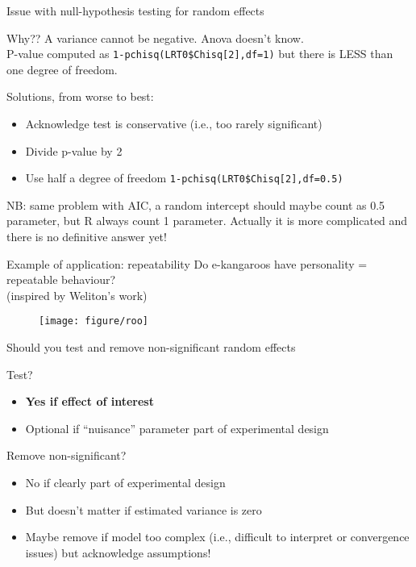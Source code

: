 \documentclass{beamer}
\begin{document}
\begin{frame}{Issue with null-hypothesis testing for random effects}
\begin{alertblock}{Why??}
    A variance cannot be negative. Anova doesn't know.\\
    P-value computed as \texttt{1-pchisq(LRT0\$Chisq[2],df=1)} but there is LESS than one degree of freedom.
\end{alertblock}
\pause
\begin{exampleblock}{Solutions, from worse to best:}
    \begin{itemize}
     \item Acknowledge test is conservative (i.e., too rarely significant) 
     \item Divide p-value by 2
     \item Use half a degree of freedom \texttt{1-pchisq(LRT0\$Chisq[2],df=0.5)} 
    \end{itemize}

\end{exampleblock}

\pause
NB: same problem with AIC, a random intercept should maybe count as 0.5 parameter, but R always count 1 parameter. Actually it is more complicated and there is no definitive answer yet! 

\end{frame}

\begin{frame}{Example of application: repeatability}
 Do e-kangaroos have personality = repeatable behaviour?\\(inspired by Weliton's work)
 \begin{figure}
 \texttt{[image: figure/roo]}
 \end{figure}
 
 
\end{frame}

\begin{frame}{Should you test and remove non-significant random effects}
 
 \begin{block}{Test?}
    \begin{itemize}
     \item \textbf{Yes if effect of interest}
     \item Optional if ``nuisance'' parameter part of experimental design
    \end{itemize}
\end{block}
\pause
 \begin{block}{Remove non-significant?}
    \begin{itemize}
     \item No if clearly part of experimental design
     \item But doesn't matter if estimated variance is zero
     \item Maybe remove if model too complex (i.e., difficult to interpret or convergence issues) but acknowledge assumptions!
    \end{itemize}
\end{block}
 
\end{frame}
\end{document}
